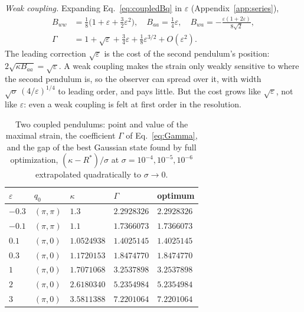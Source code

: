 \emph{Weak coupling.} Expanding Eq.~\eqref{eq:coupledBq} in $\varepsilon$ (Appendix~\ref{app:series}),
\begin{align}
B_{ww} &= \tfrac18\big(1 + \varepsilon + \tfrac32\varepsilon^2\big), \quad
B_{aa} = \tfrac14\varepsilon, \quad
B_{wa} = -\frac{\varepsilon(1+2\varepsilon)}{8\sqrt2}, \nonumber\\
\Gamma &= 1 + \sqrt\varepsilon + \tfrac34\varepsilon + \tfrac18\varepsilon^{3/2} + O(\varepsilon^2).
\label{eq:coupledseries}
\end{align}
The leading correction $\sqrt\varepsilon$ is the cost of the second pendulum's position: $2\sqrt{\kappa B_{aa}} = \sqrt\varepsilon$. A weak coupling makes the strain only weakly sensitive to where the second pendulum is, so the observer can spread over it, with width $\sqrt{\sigma}\,(4/\varepsilon)^{1/4}$ to leading order, and pays little. But the cost grows like $\sqrt\varepsilon$, not like $\varepsilon$: even a weak coupling is felt at first order in the resolution.

\begin{table}[t]
\caption{Two coupled pendulums: point and value of the maximal strain, the coefficient $\Gamma$ of Eq.~\eqref{eq:Gamma}, and the gap of the best Gaussian state found by full optimization, $(\kappa - R^*)/\sigma$ at $\sigma = 10^{-4}, 10^{-5}, 10^{-6}$ extrapolated quadratically to $\sigma \to 0$.}
\label{tab:coupled}
\begin{ruledtabular}
\begin{tabular}{lllll}
$\varepsilon$ & $q_0$ & $\kappa$ & $\Gamma$ & optimum \\
\hline
$-0.3$ & $(\pi,\pi)$ & $1.3$ & $2.2928326$ & $2.2928326$ \\
$-0.1$ & $(\pi,\pi)$ & $1.1$ & $1.7366073$ & $1.7366073$ \\
$0.1$ & $(\pi,0)$ & $1.0524938$ & $1.4025145$ & $1.4025145$ \\
$0.3$ & $(\pi,0)$ & $1.1720153$ & $1.8474770$ & $1.8474770$ \\
$1$ & $(\pi,0)$ & $1.7071068$ & $3.2537898$ & $3.2537898$ \\
$2$ & $(\pi,0)$ & $2.6180340$ & $5.2354984$ & $5.2354984$ \\
$3$ & $(\pi,0)$ & $3.5811388$ & $7.2201064$ & $7.2201064$ \\
\end{tabular}
\end{ruledtabular}
\end{table}

